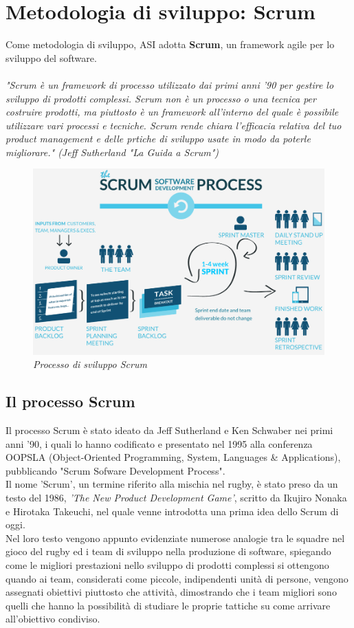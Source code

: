 \section{Metodologia di sviluppo: Scrum}
Come metodologia di sviluppo, ASI adotta \textbf{Scrum}, un framework agile per lo sviluppo del software.
\\\\
\textit{"Scrum è un framework di processo utilizzato dai primi anni '90 per gestire lo sviluppo di prodotti complessi. Scrum non è un processo o una tecnica per costruire prodotti, ma piuttosto è un framework all'interno del quale è possibile utilizzare vari processi e tecniche. Scrum rende chiara l'efficacia relativa del tuo product management e delle prtiche di sviluppo usate in modo da poterle migliorare." (Jeff Sutherland "La Guida a Scrum")}
\begin{figure}[ht]
	\centering
	\includegraphics[scale=0.35]{immagini/processo/Scrum.jpg}
	\caption{\textit{Processo di sviluppo Scrum}}
\end{figure}\FloatBarrier

\subsection{Il processo Scrum}
Il processo Scrum è stato ideato da Jeff Sutherland e Ken Schwaber nei primi anni '90, i quali lo hanno codificato e presentato nel 1995 alla conferenza OOPSLA (Object-Oriented Programming, System, Languages \& Applications), pubblicando "Scrum Sofware Development Process".
\\
Il nome 'Scrum', un termine riferito alla mischia nel rugby, è stato preso da un testo del 1986, \textit{'The New Product Development Game'}, scritto da Ikujiro Nonaka e Hirotaka Takeuchi, nel quale venne introdotta una prima idea dello Scrum di oggi.
\\
Nel loro testo vengono appunto evidenziate numerose analogie tra le squadre nel gioco del rugby ed i team di sviluppo nella produzione di software, spiegando come le migliori prestazioni nello sviluppo di prodotti complessi si ottengono quando ai team, considerati come piccole, indipendenti unità di persone, vengono assegnati obiettivi piuttosto che attività, dimostrando che i team migliori sono quelli che hanno la possibilità di studiare le proprie tattiche su come arrivare all'obiettivo condiviso.

